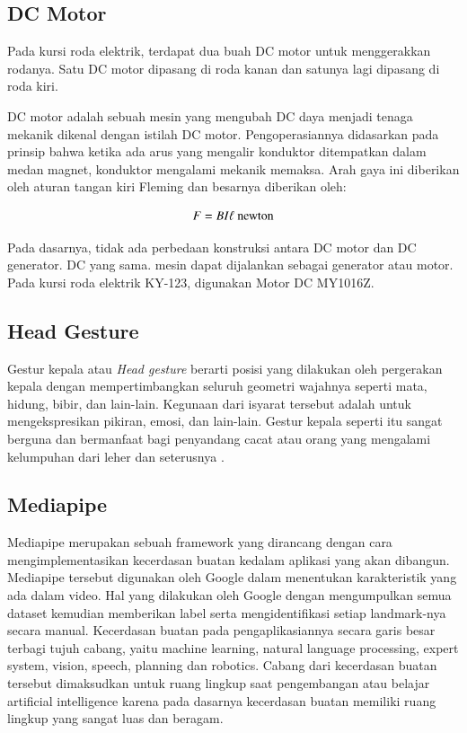 \subsection{DC Motor}
Pada kursi roda elektrik, terdapat dua buah DC motor untuk menggerakkan rodanya. Satu DC motor dipasang di roda kanan dan satunya lagi dipasang di roda kiri.

DC motor adalah sebuah mesin yang mengubah DC daya menjadi tenaga mekanik dikenal dengan istilah DC motor. Pengoperasiannya didasarkan pada prinsip bahwa ketika ada arus yang mengalir konduktor ditempatkan dalam medan magnet, konduktor mengalami mekanik memaksa. Arah gaya ini diberikan oleh aturan tangan kiri Fleming dan besarnya diberikan oleh:


\begin{equation}
    \label{eq:biot-savart}
    F = BI\ell{} 
    \textnormal{ newton}
\end{equation}


Pada dasarnya, tidak ada perbedaan konstruksi antara DC motor dan DC generator. DC yang sama. mesin dapat dijalankan sebagai generator atau motor\parencite{dcmotor}. Pada kursi roda elektrik KY-123, digunakan Motor DC MY1016Z.

\subsection{Head Gesture}
Gestur kepala atau \emph{Head gesture} berarti posisi yang dilakukan oleh pergerakan kepala dengan mempertimbangkan seluruh geometri wajahnya seperti mata, hidung, bibir, dan lain-lain. Kegunaan dari isyarat tersebut adalah untuk mengekspresikan pikiran, emosi, dan lain-lain. Gestur kepala seperti itu sangat berguna dan bermanfaat bagi penyandang cacat atau orang yang mengalami kelumpuhan dari leher dan seterusnya \parencite{bankar}.

\subsection{Mediapipe}
Mediapipe merupakan sebuah framework yang dirancang dengan cara mengimplementasikan kecerdasan buatan kedalam aplikasi yang akan dibangun. Mediapipe tersebut digunakan oleh Google dalam menentukan karakteristik yang ada dalam video. Hal yang dilakukan oleh Google dengan mengumpulkan semua dataset kemudian memberikan label serta mengidentifikasi setiap landmark-nya secara manual. Kecerdasan buatan pada pengaplikasiannya secara garis besar terbagi tujuh cabang, yaitu machine learning, natural language processing, expert system, vision, speech, planning dan robotics. Cabang dari kecerdasan buatan tersebut dimaksudkan untuk ruang lingkup saat pengembangan atau belajar artificial intelligence karena pada dasarnya kecerdasan buatan memiliki ruang lingkup yang sangat luas dan beragam\parencite{MediaPipe2023}.

